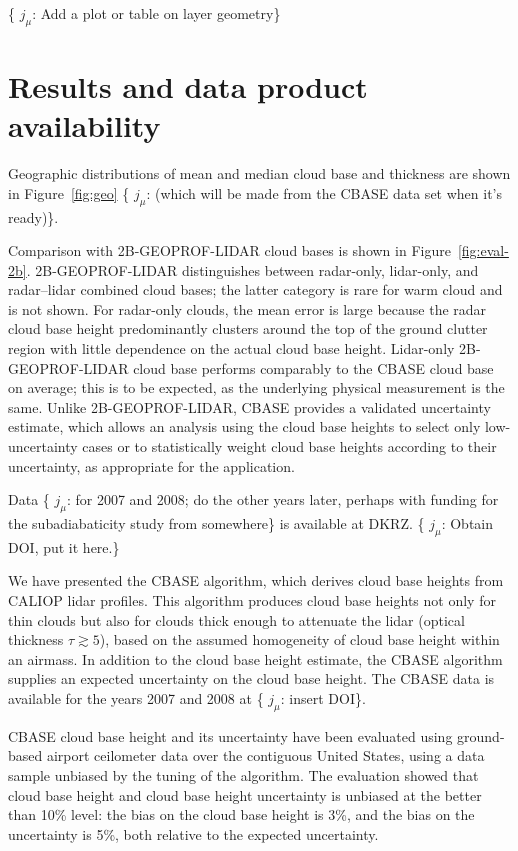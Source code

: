 \documentclass[amt,manuscript]{copernicus}\usepackage[]{graphicx}\usepackage[]{color}
\newcommand{\hlnum}[1]{\textcolor[rgb]{0.686,0.059,0.569}{#1}}%
\newcommand\comment[2]{\{\hlnum{ \textit{#1}: #2}\}}
\newcommand\commentjm[1]{\comment{$j_\mu$}{#1}}
\begin{document}
\commentjm{Add a plot or table on layer geometry}

\section{Results and data product availability}
\label{sec:results}

Geographic distributions of mean and median cloud base and thickness are shown
in Figure~\ref{fig:geo} \commentjm{(which will be made from the CBASE data set
  when it's ready)}.

Comparison with 2B-GEOPROF-LIDAR cloud bases is shown in
Figure~\ref{fig:eval-2b}.   2B-GEOPROF-LIDAR distinguishes between radar-only,
lidar-only, and radar--lidar combined cloud bases; the latter category is rare
for warm cloud and is not shown.  For radar-only clouds, the mean error is large
because the radar cloud base height predominantly clusters around the top of the
ground clutter region with little dependence on the actual cloud base height.
Lidar-only 2B-GEOPROF-LIDAR cloud base performs comparably to the CBASE cloud
base on average; this is to be expected, as the underlying physical measurement
is the same.   Unlike 2B-GEOPROF-LIDAR, CBASE provides a validated uncertainty
estimate, which allows an analysis using the cloud base heights to select only
low-uncertainty cases or to statistically weight cloud base heights according to
their uncertainty, as appropriate for the application.

Data \commentjm{for 2007 and 2008; do the other years later, perhaps with
  funding for the subadiabaticity study from somewhere} is available at DKRZ.
\commentjm{Obtain DOI, put it here.}

\conclusions
\label{sec:conclusions}

We have presented the CBASE algorithm, which derives cloud base heights from
CALIOP lidar profiles.  This algorithm produces cloud base heights not only for
thin clouds but also for clouds thick enough to attenuate the lidar (optical
thickness $\tau \gtrsim 5$), based on the assumed homogeneity of cloud base
height within an airmass.  In addition to the cloud base height estimate, the
CBASE algorithm supplies an expected uncertainty on the cloud base height.
The CBASE data is available for the years 2007 and 2008 at \commentjm{insert DOI}.

CBASE cloud base height and its uncertainty have been evaluated using
ground-based airport ceilometer data over the contiguous United States, using a
data sample unbiased by the tuning of the algorithm.  The evaluation showed that
cloud base height and cloud base height uncertainty is unbiased at the better
than 10\% level: the bias on the cloud base height is %
3\%,
and the bias on the uncertainty is %
5\%, both relative to the expected uncertainty.
\end{document}
